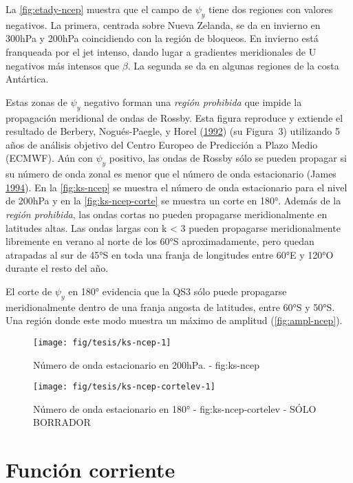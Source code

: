 \documentclass[spanish,a4paper]{book}
\begin{document}
La \autoref{fig:etady-ncep} muestra que el campo de \(\psi_y\) tiene dos
regiones con valores negativos. La primera, centrada sobre Nueva
Zelanda, se da en invierno en 300hPa y 200hPa coincidiendo con la región
de bloqueos. En invierno está franqueada por el jet intenso, dando lugar
a gradientes meridionales de U negativos más intensos que \(\beta\). La
segunda se da en algunas regiones de la costa Antártica.

Estas zonas de \(\psi_y\) negativo forman una \emph{región prohibida}
que impide la propagación meridional de ondas de Rossby. Esta figura
reproduce y extiende el resultado de Berbery, Nogués-Paegle, y Horel
(\protect\hyperlink{ref-Berbery1992}{1992}) (su Figura~3) utilizando 5
años de análisis objetivo del Centro Europeo de Predicción a Plazo Medio
(ECMWF). Aún con \(\psi_y\) positivo, las ondas de Rossby sólo se pueden
propagar si su número de onda zonal es menor que el número de onda
estacionario (James \protect\hyperlink{ref-James}{1994}). En la
\autoref{fig:ks-ncep} se muestra el número de onda estacionario para el
nivel de 200hPa y en la \autoref{fig:ks-ncep-corte} se muestra un corte
en 180°. Además de la \emph{región prohibida}, las ondas cortas no
pueden propagarse meridionalmente en latitudes altas. Las ondas largas
con k \textless{} 3 pueden propagarse meridionalmente libremente en
verano al norte de los 60°S aproximadamente, pero quedan atrapadas al
sur de 45°S en toda una franja de longitudes entre 60°E y 120°O durante
el resto del año.

El corte de \(\psi_y\) en 180° evidencia que la QS3 sólo puede
propagarse meridionalmente dentro de una franja angosta de latitudes,
entre 60°S y 50°S. Una región donde este modo muestra un máximo de
amplitud (\autoref{fig:ampl-ncep}).

\begin{figure}
\texttt{[image: fig/tesis/ks-ncep-1]} \caption{Número de onda estacionario en 200hPa. - fig:ks-ncep}\label{fig:ks-ncep}
\end{figure}

\begin{figure}
\texttt{[image: fig/tesis/ks-ncep-cortelev-1]} \caption{Número de onda estacionario en 180° - fig:ks-ncep-cortelev - SÓLO BORRADOR}\label{fig:ks-ncep-cortelev}
\end{figure}

\section{Función corriente}\label{funcion-corriente}
\end{document}
